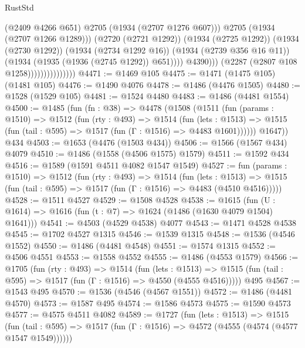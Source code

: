\begin{lexlean}{RustStd}
\begin{coremodule}
                                            (@2409 @4266 @651)
                                            @2705
                                            (@1934 (@2707 @1276 @607)))
                                          @2705
                                          (@1934 (@2707 @1266 @1289)))
                                        (@2720 (@2721 @1292))
                                        (@1934 (@2725 @1292))
                                        (@1934 (@2730 @1292))
                                        (@1934 (@2734 @1292 @16))
                                        (@1934 (@2739 @356 @16 @11))
                                        (@1934 (@1935 (@1936 (@2745 @1292)) @651))))
                                    @4390)))
                              (@2287 (@2807 @108 @1258)))))))))))))))
@4471 := @1469 @105
@4475 := @1471 (@1475 @105) (@1481 @105)
@4476 := @1490 @4076
@4478 := @1486 (@4476 @1505)
@4480 := @1528 (@1529 @105)
@4481 := @1524 @4480
@4483 := @1486 (@4481 @1554)
@4500 := @1485
    (fun (fn : @38) =>
    @4478
      (@1508
        (@1511
          (fun (params : @1510) =>
          @1512
            (fun (rty : @493) =>
            @1514
              (fun (lets : @1513) =>
              @1515 (fun (tail : @595) => @1517 (fun (Γ : @1516) => @4483 @1601))))))
        @1647))
    @434
@4503 := @1653 (@4476 (@1503 @434))
@4506 := @1566 (@1567 @434) @4079
@4510 := @1486 (@1558 (@4506 @1575) @1579)
@4511 := @1592 @434
@4516 := @1589 (@1591 @4511 @4082 @1547 @1549)
@4527 := fun (params : @1510) =>
  @1512
    (fun (rty : @493) =>
    @1514
      (fun (lets : @1513) =>
      @1515 (fun (tail : @595) => @1517 (fun (Γ : @1516) => @4483 (@4510 @4516)))))
@4528 := @1511 @4527
@4529 := @1508 @4528
@4538 := @1615 (fun (U : @1614) => @1616 (fun (t : @7) => @1624 (@1486 (@1630 @4079 @1504) @1641)))
@4541 := @4503 (@4529 @4538) @4077
@4543 := @1471 @4528 @4538
@4545 := @1702 @4527 @1315
@4546 := @1539 @1315
@4548 := @1536 (@4546 @1552)
@4550 := @1486 (@4481 @4548)
@4551 := @1574 @1315
@4552 := @4506 @4551
@4553 := @1558 @4552
@4555 := @1486 (@4553 @1579)
@4566 := @1705
    (fun (rty : @493) =>
    @1514
      (fun (lets : @1513) =>
      @1515 (fun (tail : @595) => @1517 (fun (Γ : @1516) => @4550 (@4555 @4516)))))
    @495
@4567 := @1543 @495
@4570 := @1536 (@4546 (@4567 @1551))
@4572 := @1486 (@4481 @4570)
@4573 := @1587 @495
@4574 := @1586 @4573
@4575 := @1590 @4573
@4577 := @4575 @4511 @4082
@4589 := @1727
    (fun (lets : @1513) =>
    @1515
      (fun (tail : @595) => @1517 (fun (Γ : @1516) => @4572 (@4555 (@4574 (@4577 @1547 @1549))))))

\end{coremodule}
\end{lexlean}
